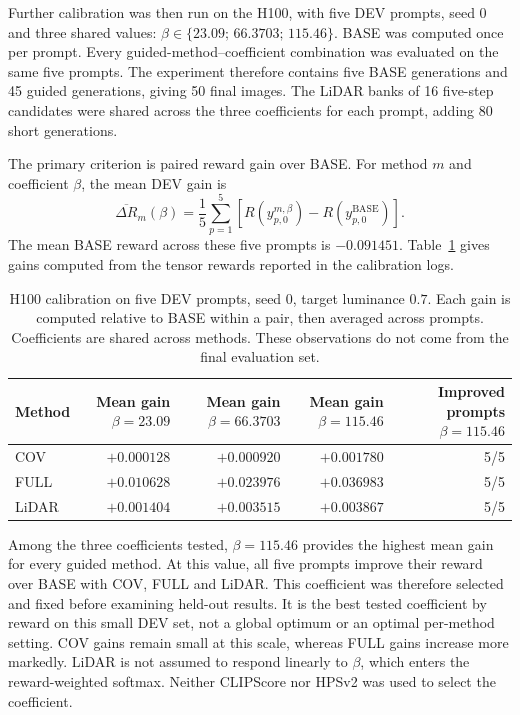 \documentclass[11pt,a4paper]{article}
\begin{document}
Further calibration was then run on the H100, with five DEV prompts, seed 0 and three shared values: $\beta\in\{23.09;\,66.3703;\,115.46\}$. BASE was computed once per prompt. Every guided-method--coefficient combination was evaluated on the same five prompts. The experiment therefore contains five BASE generations and 45 guided generations, giving 50 final images. The LiDAR banks of 16 five-step candidates were shared across the three coefficients for each prompt, adding 80 short generations.

The primary criterion is paired reward gain over BASE. For method $m$ and coefficient $\beta$, the mean DEV gain is
\[
\overline{\Delta R}_{m}(\beta)=\frac15\sum_{p=1}^{5}
\left[R(y_{p,0}^{m,\beta})-R(y_{p,0}^{\mathrm{BASE}})\right].
\]
The mean BASE reward across these five prompts is $-0.091451$. Table~\ref{tab:calibrationh100} gives gains computed from the tensor rewards reported in the calibration logs.

\begin{table}[htbp]
\centering\small
\setlength{\tabcolsep}{5pt}
\begin{tabular}{lrrrr}
\toprule
Method & \shortstack{Mean gain\\$\beta=23.09$} & \shortstack{Mean gain\\$\beta=66.3703$} & \shortstack{Mean gain\\$\beta=115.46$} & \shortstack{Improved prompts\\$\beta=115.46$}\\
\midrule
COV & $+0.000128$ & $+0.000920$ & $+0.001780$ & 5/5\\
FULL & $+0.010628$ & $+0.023976$ & $+0.036983$ & 5/5\\
LiDAR & $+0.001404$ & $+0.003515$ & $+0.003867$ & 5/5\\
\bottomrule
\end{tabular}
\caption{H100 calibration on five DEV prompts, seed 0, target luminance $0.7$. Each gain is computed relative to BASE within a pair, then averaged across prompts. Coefficients are shared across methods. These observations do not come from the final evaluation set.}
\label{tab:calibrationh100}
\end{table}

Among the three coefficients tested, $\beta=115.46$ provides the highest mean gain for every guided method. At this value, all five prompts improve their reward over BASE with COV, FULL and LiDAR. This coefficient was therefore selected and fixed before examining held-out results. It is the best tested coefficient by reward on this small DEV set, not a global optimum or an optimal per-method setting. COV gains remain small at this scale, whereas FULL gains increase more markedly. LiDAR is not assumed to respond linearly to $\beta$, which enters the reward-weighted softmax. Neither CLIPScore nor HPSv2 was used to select the coefficient.
\end{document}
